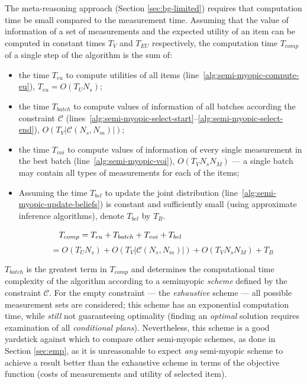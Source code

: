 The meta-reasoning approach (Section \ref{sec:bg-limited}) requires
that computation time be small compared to the measurement
time. Assuming that the value of information of a set of measurements 
and the expected utility of an item can be computed in constant times
$T_V$ and $T_{EU}$ respectively, the computation time  $T_{comp}$ of a single
step of the algorithm is the sum of:

\begin{itemize}
\item the time $T_{eu}$ to compute utilities of all items
  (line~\ref{alg:semi-myopic-compute-eu}),
  $T_{eu}=O(T_UN_s)$;
\item the time $T_{batch}$ to compute values of information of all batches
  according the constraint $\mathcal{C}$
  (lines~\ref{alg:semi-myopic-select-start}--\ref{alg:semi-myopic-select-end}),
  $O(T_V|\mathcal{C}(N_s, N_m)|)$;
\item the time $T_{voi}$ to compute values of information of every single
  measurement in the best batch
  (line~\ref{alg:semi-myopic-voi}),
  $O(T_VN_sN_M)$ --- a single batch may contain all types of
  measurements for each of the items;
\item Assuming the time $T_{bel}$ to update the joint distribution
  (line~\ref{alg:semi-myopic-update-beliefs}) is constant and
  sufficiently small (using approximate inference
  algorithms), denote $T_{bel}$ by $T_B$.
\end{itemize}
\begin{equation}
  \label{eq:thr-computation-time}
  \hspace{-8em}T_{comp}=T_{eu}+T_{batch}+T_{voi}+T_{bel}
\end{equation}
\vspace{-2em}
\begin{equation*}
\hspace{2em}=O(T_UN_s)+O(T_V|\mathcal{C}(N_s, N_m)|)+O(T_VN_sN_M)+T_B\nonumber
\end{equation*}

$T_{batch}$ is the greatest term in $T_{comp}$ and determines the
computational time complexity of the algorithm according to a
semimyopic {\em scheme} defined by the constraint $\mathcal{C}$.  For
the empty constraint --- the {\em exhaustive} scheme --- all possible
measurement sets are considered; this scheme has an exponential
computation time, while {\em still} not guaranteeing optimality (finding an
\emph{optimal} solution requires examination of all \emph{conditional plans}).
Nevertheless, this scheme is a good yardstick against which
to compare other semi-myopic schemes, as done in Section \ref{sec:emp},
as it is unreasonable to expect {\em any} semi-myopic scheme to
achieve a result better than the exhaustive scheme in terms of the objective
function (costs of measurements and utility of selected item).

